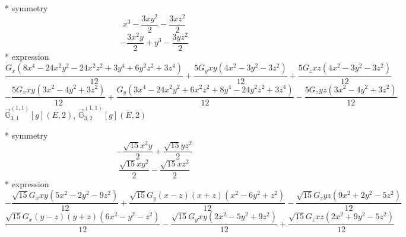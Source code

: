 \documentclass[fleqn,8pt]{jsarticle}
\begin{document}
\noindent\quad ** symmetry
\begin{dmath*}
x^{3} - \frac{3 x y^{2}}{2} - \frac{3 x z^{2}}{2}
\end{dmath*}
\begin{dmath*}
- \frac{3 x^{2} y}{2} + y^{3} - \frac{3 y z^{2}}{2}
\end{dmath*}
\noindent\quad ** expression
\begin{dmath*}
\frac{G_{x} \left(8 x^{4} - 24 x^{2} y^{2} - 24 x^{2} z^{2} + 3 y^{4} + 6 y^{2} z^{2} + 3 z^{4}\right)}{12} + \frac{5 G_{y} x y \left(4 x^{2} - 3 y^{2} - 3 z^{2}\right)}{12} + \frac{5 G_{z} x z \left(4 x^{2} - 3 y^{2} - 3 z^{2}\right)}{12}
\end{dmath*}
\begin{dmath*}
- \frac{5 G_{x} x y \left(3 x^{2} - 4 y^{2} + 3 z^{2}\right)}{12} + \frac{G_{y} \left(3 x^{4} - 24 x^{2} y^{2} + 6 x^{2} z^{2} + 8 y^{4} - 24 y^{2} z^{2} + 3 z^{4}\right)}{12} - \frac{5 G_{z} y z \left(3 x^{2} - 4 y^{2} + 3 z^{2}\right)}{12}
\end{dmath*}
\noindent\quad $\vec{\mathbb{G}}_{3,1}^{(1,1)}[g](E,2)$, $\vec{\mathbb{G}}_{3,2}^{(1,1)}[g](E,2)$

\noindent\quad ** symmetry
\begin{dmath*}
- \frac{\sqrt{15} x^{2} y}{2} + \frac{\sqrt{15} y z^{2}}{2}
\end{dmath*}
\begin{dmath*}
\frac{\sqrt{15} x y^{2}}{2} - \frac{\sqrt{15} x z^{2}}{2}
\end{dmath*}
\noindent\quad ** expression
\begin{dmath*}
- \frac{\sqrt{15} G_{x} x y \left(5 x^{2} - 2 y^{2} - 9 z^{2}\right)}{12} + \frac{\sqrt{15} G_{y} \left(x - z\right) \left(x + z\right) \left(x^{2} - 6 y^{2} + z^{2}\right)}{12} - \frac{\sqrt{15} G_{z} y z \left(9 x^{2} + 2 y^{2} - 5 z^{2}\right)}{12}
\end{dmath*}
\begin{dmath*}
\frac{\sqrt{15} G_{x} \left(y - z\right) \left(y + z\right) \left(6 x^{2} - y^{2} - z^{2}\right)}{12} - \frac{\sqrt{15} G_{y} x y \left(2 x^{2} - 5 y^{2} + 9 z^{2}\right)}{12} + \frac{\sqrt{15} G_{z} x z \left(2 x^{2} + 9 y^{2} - 5 z^{2}\right)}{12}
\end{dmath*}
\end{document}
